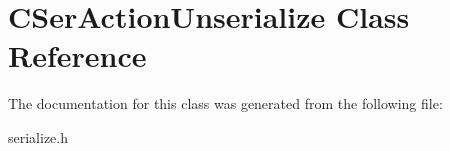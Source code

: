 \hypertarget{class_c_ser_action_unserialize}{}\section{C\+Ser\+Action\+Unserialize Class Reference}
\label{class_c_ser_action_unserialize}


The documentation for this class was generated from the following file\+:\begin{DoxyCompactItemize}
\item 
serialize.\+h\end{DoxyCompactItemize}

